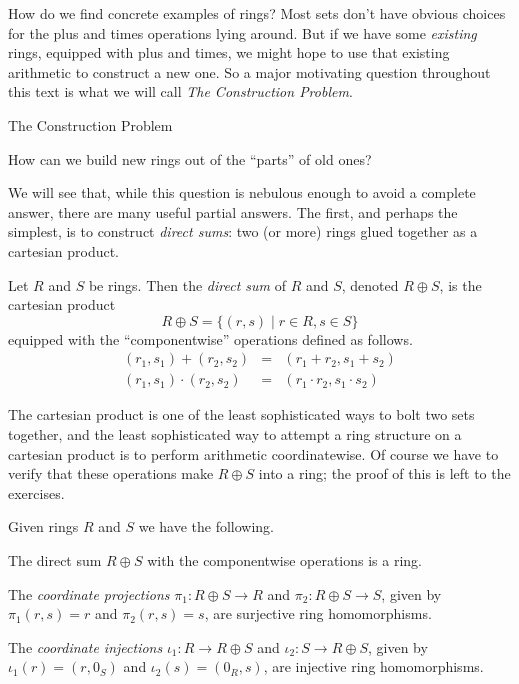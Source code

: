 How do we find concrete examples of rings?
Most sets don't have obvious choices for the plus and times operations lying around.
But if we have some \emph{existing} rings, equipped with plus and times, we might hope to use that existing arithmetic to construct a new one.
So a major motivating question throughout this text is what we will call \emph{The Construction Problem}.
\begin{titlebox}{The Construction Problem}
\begin{center}
How can we build new rings out of the ``parts'' of old ones?
\end{center}
\end{titlebox}
We will see that, while this question is nebulous enough to avoid a complete answer, there are many useful partial answers.
The first, and perhaps the simplest, is to construct \emph{direct sums}: two (or more) rings glued together as a cartesian product.

\begin{dfn} \label{dfn:direct-sum}
Let \(R\) and \(S\) be rings.
Then the \emph{direct sum} of \(R\) and \(S\), denoted \(R \oplus S\), is the cartesian product \[ R \oplus S = \{ (r,s) \mid r \in R, s \in S \} \] equipped with the ``componentwise'' operations defined as follows.
\begin{eqnarray*}
(r_1, s_1) + (r_2, s_2) & = & (r_1 + r_2, s_1 + s_2) \\
(r_1, s_1) \cdot (r_2, s_2) & = & (r_1 \cdot r_2, s_1 \cdot s_2)
\end{eqnarray*}
\end{dfn}

The cartesian product is one of the least sophisticated ways to bolt two sets together, and the least sophisticated way to attempt a ring structure on a cartesian product is to perform arithmetic coordinatewise.
Of course we have to verify that these operations make \(R \oplus S\) into a ring; the proof of this is left to the exercises.

\begin{prop} \label{prop:direct-sum}
Given rings \(R\) and \(S\) we have the following.
\begin{proplist}
\item The direct sum \(R \oplus S\) with the componentwise operations is a ring.
\item The \emph{coordinate projections} \(\pi_1 : R \oplus S \rightarrow R\) and \(\pi_2 : R \oplus S \rightarrow S\), given by \(\pi_1(r,s) = r\) and \(\pi_2(r,s) = s\), are surjective ring homomorphisms.
\item The \emph{coordinate injections} \(\iota_1 : R \rightarrow R \oplus S\) and \(\iota_2 : S \rightarrow R \oplus S\), given by \(\iota_1(r) = (r,0_S)\) and \(\iota_2(s) = (0_R,s)\), are injective ring homomorphisms.
\end{proplist}
\end{prop}

